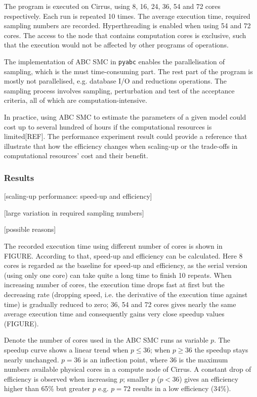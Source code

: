 \documentclass[12pt,a4paper]{report}
\begin{document}
The program is executed on Cirrus, using 8, 16, 24, 36, 54 and 72 cores respectively. Each run is repeated 10 times. The average execution time, required sampling numbers are recorded. Hyperthreading is enabled when using 54 and 72 cores. The access to the node that contains computation cores is exclusive, such that the execution would not be affected by other programs of operations.

The implementation of ABC SMC in \verb|pyabc| enables the parallelisation of sampling, which is the must time-consuming part. The rest part of the program is mostly not parallelised, e.g. database I/O and reductions operations. The sampling process involves sampling, perturbation and test of the acceptance criteria, all of which are computation-intensive. 

In practice, using ABC SMC to estimate the parameters of a given model could cost up to several hundred of hours if the computational resources is limited[REF]. The performance experiment result could provide a reference that illustrate that how the efficiency changes when scaling-up or the trade-offs in computational resources' cost and their benefit.

\subsubsection{Results}

[scaling-up performance: speed-up and efficiency]

[large variation in required sampling numbers]

[possible reasons]

The recorded execution time using different number of cores is shown in FIGURE. According to that, speed-up and efficiency can be calculated. Here 8 cores is regarded as the baseline for speed-up and efficiency, as the serial version (using only one core) can take quite a long time to finish 10 repeats. When increasing number of cores, the execution time drops fast at first but the decreasing rate (dropping speed, i.e. the derivative of the execution time against time) is gradually reduced to zero; 36, 54 and 72 cores gives nearly the same average execution time and consequently gains very close speedup values (FIGURE). 

Denote the number of cores used in the ABC SMC runs as variable $p$. The speedup curve shows a linear trend when $p\leq 36$; when $p\geq 36$ the speedup stays nearly unchanged. $p=36$ is an inflection point, where 36 is the maximum numbers available physical cores in a compute node of Cirrus. A constant drop of efficiency is observed when increasing $p$; smaller $p$ ($p<36$) gives an efficiency higher than 65\% but greater $p$ e.g. $p=72$ results in a low efficiency (34\%).
\end{document}
